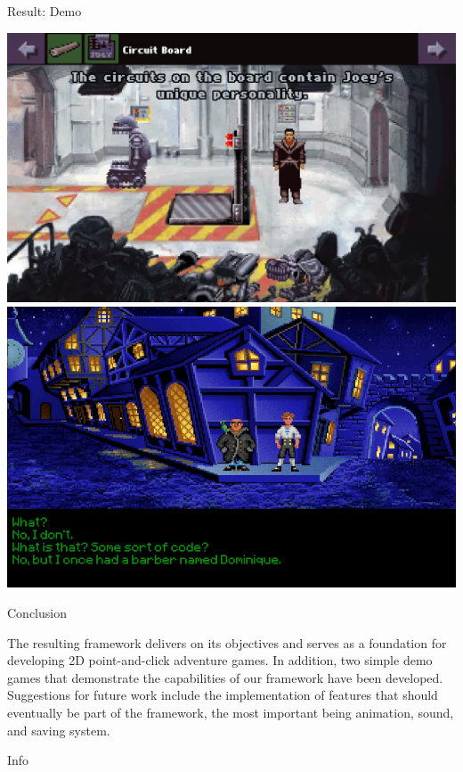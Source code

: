 \documentclass[portrait,a0paper,fontscale=0.33]{baposter}
\begin{document}
\begin{poster}
\begin{posterbox}[column=1, name=result2, below=ds]{Result: Demo}
\begin{center}
\includegraphics[width=0.506\linewidth]{img/manual.png}
\includegraphics[width=0.486\linewidth]{img/manual-tsomi.png}
\end{center}
\end{posterbox}


\begin{posterbox}[column=1, name=conclusion, below=result2, headerColorOne=yellow!80!orange!95!black, boxColorOne=yellow!33]{Conclusion}


The resulting framework delivers on its objectives and serves as a foundation for developing 2D point-and-click adventure games. In addition, two simple demo games that demonstrate the capabilities of our framework have been developed. Suggestions for future work include the implementation of features that should eventually be part of the framework, the most important being animation, sound, and saving system. 

\end{posterbox}


\begin{posterbox}[column=1, name=info, below=conclusion]{Info}

 



\end{posterbox}
\end{poster}
\end{document}
